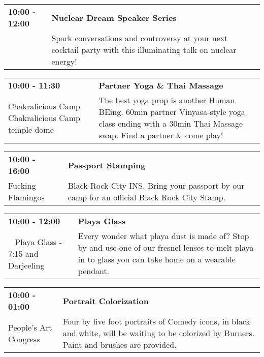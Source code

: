 \begin{tabular}{ p{1in} p{2.2in} }
    \textbf{10:00 - 12:00} & \textbf{Nuclear Dream Speaker Series} \\
    ~ \newline  & Spark conversations and controversy at your next cocktail party with this illuminating talk on nuclear energy! \\
    \hline 
\end{tabular}
    
\begin{tabular}{ p{1in} p{2.2in} }
    \textbf{10:00 - 11:30} & \textbf{Partner Yoga \& Thai Massage} \\
    Chakralicious Camp \newline Chakralicious Camp temple dome & The best yoga prop is another Human BEing. 60min partner Vinyasa-style yoga class ending with a 30min Thai Massage swap. Find a partner \& come play! \\
    \hline 
\end{tabular}
    
\begin{tabular}{ p{1in} p{2.2in} }
    \textbf{10:00 - 16:00} & \textbf{Passport Stamping} \\
    Fucking Flamingos \newline  & Black Rock City INS. Bring your passport by our camp for an official Black Rock City Stamp. \\
    \hline 
\end{tabular}
    
\begin{tabular}{ p{1in} p{2.2in} }
    \textbf{10:00 - 12:00} & \textbf{Playa Glass} \\
    ~ \newline Playa Glass - 7:15 and Darjeeling & Every wonder what playa dust is made of?  Stop by and use one of our fresnel lenses to melt playa in to glass you can take home on a wearable pendant. \\
    \hline 
\end{tabular}
    
\begin{tabular}{ p{1in} p{2.2in} }
    \textbf{10:00 - 01:00} & \textbf{Portrait Colorization} \\
    People's Art Congress \newline  & Four by five foot portraits of Comedy icons, in black and white, will be waiting to be colorized by Burners. Paint and brushes are provided. \\
    \hline 
\end{tabular}
    
